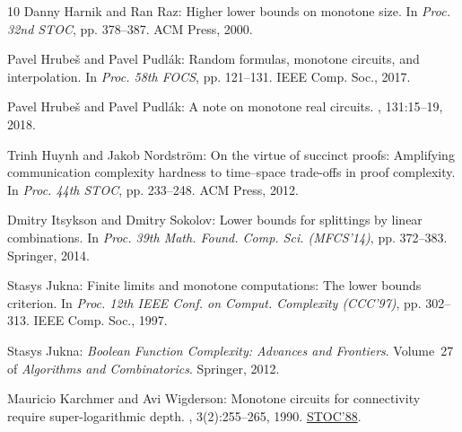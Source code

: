 \documentclass[11pt]{article}
\numberwithin{equation}{section}
\theoremstyle{definition}
\theoremstyle{plain}
\begin{document}
\begin{thebibliography}{10}
{\sc Danny Harnik and Ran Raz}: Higher lower bounds on monotone size.
\newblock In {\em Proc. 32nd STOC}, pp. 378--387. ACM Press, 2000.
\newblock [\epfmtdoi{10.1145/335305.335349}]

{\sc Pavel Hrube{\v{s}} and Pavel Pudl{\'a}k}: Random formulas, monotone
  circuits, and interpolation.
\newblock In {\em Proc. 58th FOCS}, pp. 121--131. IEEE Comp. Soc., 2017.

{\sc Pavel Hrube{\v{s}} and Pavel Pudl{\'a}k}: A note on monotone real
  circuits.
, 131:15--19, 2018.

{\sc Trinh Huynh and Jakob Nordstr{\"o}m}: On the virtue of succinct proofs:
  Amplifying communication complexity hardness to time--space trade-offs in
  proof complexity.
\newblock In {\em Proc. 44th STOC}, pp. 233--248. ACM Press, 2012.
\newblock [\epfmtdoi{10.1145/2213977.2214000}]

{\sc Dmitry Itsykson and Dmitry Sokolov}: Lower bounds for splittings by linear
  combinations.
\newblock In {\em Proc. 39th Math. Found. Comp. Sci. (MFCS'14)}, pp. 372--383.
  Springer, 2014.
\newblock [\epfmtdoi{10.1007/978-3-662-44465-8\_32}]

{\sc Stasys Jukna}: Finite limits and monotone computations: {T}he lower bounds
  criterion.
\newblock In {\em Proc. 12th IEEE Conf. on Comput. Complexity (CCC'97)}, pp.
  302--313. IEEE Comp. Soc., 1997.

{\sc Stasys Jukna}: {\em Boolean Function Complexity: Advances and Frontiers}.
\newblock Volume~27 of {\em Algorithms and Combinatorics}.
\newblock Springer, 2012.
\newblock [\epfmtdoi{10.1007/978-3-642-24508-4}]

{\sc Mauricio Karchmer and Avi Wigderson}: Monotone circuits for connectivity
  require super-logarithmic depth.
, 3(2):255--265, 1990.
\newblock \prelim \href{https://doi.org/10.1145/62212.62265}{STOC'88}.
\newblock [\epfmtdoi{10.1137/0403021}]


\end{thebibliography}
\end{document}
